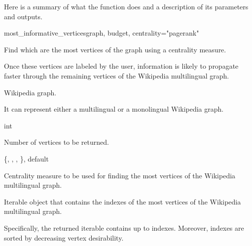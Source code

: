             Here is a summary of what the function does and a description of its parameters and outputs.
            \begin{independentfunctiondoc}{most\_informative\_vertices}{graph, budget, centrality="pagerank"}
                \begin{functiondescription}
                    Find which are the most  vertices of the graph using a centrality measure.
                    
                    Once these vertices are labeled by the user, information is likely to propagate faster through the remaining vertices of the Wikipedia multilingual graph.
                \end{functiondescription}
                
                \begin{functionparameters}
                    \item[graph] 
                    
                    Wikipedia graph.
                    
                    It can represent either a multilingual or a monolingual Wikipedia graph.
                    \item[budget] int
                    
                    Number of vertices to be returned.
                    \item[centrality] \{, , , \}, default 
                    
                    Centrality measure to be used for finding the most  vertices of the Wikipedia multilingual graph.
                \end{functionparameters}
                
                \begin{functionoutput}
                    Iterable object that contains the indexes of the most  vertices of the Wikipedia multilingual graph.
                    
                    Specifically, the returned iterable contains up to  \normalfont indexes. Moreover, indexes are sorted by decreasing vertex desirability.
                \end{functionoutput}
            \end{independentfunctiondoc}

